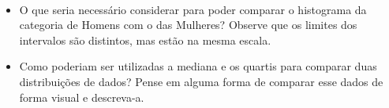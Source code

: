 \


\begin{reflection}

\begin{itemize}
\item {} 
O que seria necessário considerar para poder comparar o histograma da categoria de Homens com o das Mulheres? Observe que os limites dos intervalos são distintos, mas estão na mesma escala.

\item {} 
Como poderiam ser utilizadas a mediana e os quartis para comparar duas distribuições de dados? Pense em alguma forma de comparar esse dados de forma visual e descreva-a.

\end{itemize}
\end{reflection}

\label{\detokenize{PE104-2:ativ-comparacao-de-diferentes-grupos}}

